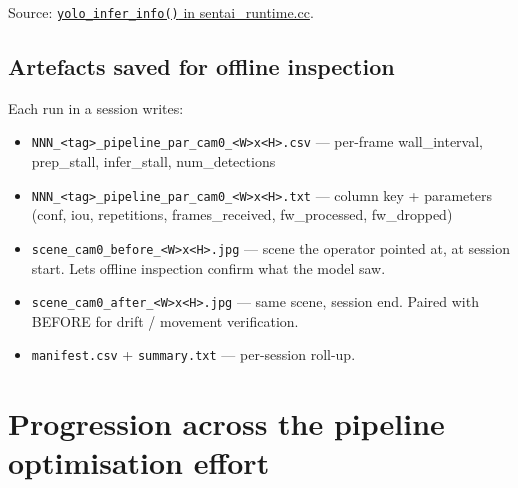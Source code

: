 Source: \href{../sentai_runtime.cc}{\texttt{yolo\_infer\_info()} in
sentai\_runtime.cc}.

\subsection{Artefacts saved for offline
inspection}\label{artefacts-saved-for-offline-inspection}

Each run in a session writes:

\begin{itemize}
\tightlist
\item
  \texttt{NNN\_\textless{}tag\textgreater{}\_pipeline\_par\_cam0\_\textless{}W\textgreater{}x\textless{}H\textgreater{}.csv}
  --- per-frame wall\_interval, prep\_stall, infer\_stall,
  num\_detections
\item
  \texttt{NNN\_\textless{}tag\textgreater{}\_pipeline\_par\_cam0\_\textless{}W\textgreater{}x\textless{}H\textgreater{}.txt}
  --- column key + parameters (conf, iou, repetitions, frames\_received,
  fw\_processed, fw\_dropped)
\item
  \texttt{scene\_cam0\_before\_\textless{}W\textgreater{}x\textless{}H\textgreater{}.jpg}
  --- scene the operator pointed at, at session start. Lets offline
  inspection confirm what the model saw.
\item
  \texttt{scene\_cam0\_after\_\textless{}W\textgreater{}x\textless{}H\textgreater{}.jpg}
  --- same scene, session end. Paired with BEFORE for drift / movement
  verification.
\item
  \texttt{manifest.csv} + \texttt{summary.txt} --- per-session roll-up.
\end{itemize}

\section{Progression across the pipeline optimisation
effort}\label{progression-across-the-pipeline-optimisation-effort}

